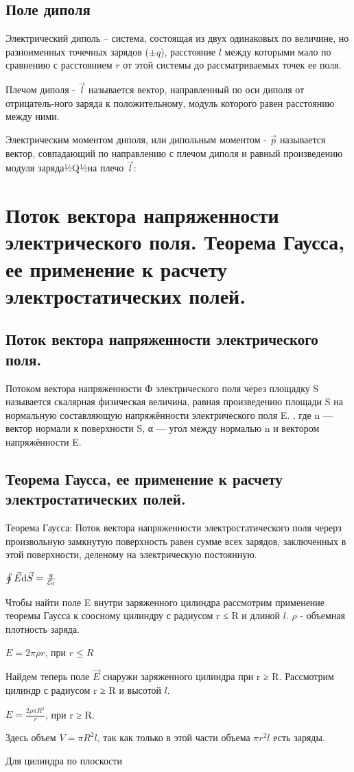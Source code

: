 \documentclass[12pt]{report}
\begin{document}
\subsection{Поле диполя}
Электрический диполь – система, состоящая из двух одинаковых по величине, но разноименных точечных зарядов ($\pm q$), расстояние $l$ между которыми мало по сравнению с расстоянием $r$ от этой системы до рассматриваемых точек ее поля.

Плечом диполя - $\vec{l}$ называется вектор, направленный по оси диполя от отрицатель-ного заряда к положительному, модуль которого равен расстоянию между ними.

Электрическим моментом диполя, или дипольным моментом - $\vec{p}$ называется вектор, совпадающий по направлению с плечом диполя и равный произведению модуля заряда½Q½на плечо $\vec{l}$:
\section{Поток вектора напряженности электрического поля.
  Теорема Гаусса, ее применение к расчету электростатических полей.}
\subsection{Поток вектора напряженности электрического поля.}
Потоком вектора напряженности Ф электрического поля через площадку S называется скалярная физическая величина,
равная произведению площади S на нормальную составляющую напряжённости электрического поля E. , где n — вектор нормали к поверхности S, α — угол между нормалью n и вектором напряжённости E.
\subsection{Теорема Гаусса, ее применение к расчету электростатических полей.}
Теорема Гаусса: Поток вектора напряженности электростатического поля черерз произвольную замкнутую поверхность равен сумме всех зарядов, заключенных в этой поверхности, деленому на электрическую постоянную.
\begin{center}
    $\oint \vec{E}\differential\vec{S} = \frac{q}{\varE_0}$
\end{center}
Чтобы найти поле E внутри заряженного цилиндра рассмотрим
применение теоремы Гаусса к соосному цилиндру с радиусом r ≤ R и длиной $l$.
$\rho$ - объемная плотность заряда.
\begin{center}
    $E = 2 \pi \rho r$, при $r ≤ R$
\end{center}
Найдем теперь поле $\vec{E}$ снаружи заряженного цилиндра при r ≥ R.
Рассмотрим цилиндр с радиусом r ≥ R и высотой $l$.
\begin{center}
    $E = \frac{2 \rho \pi R^2}{r}$, при r ≥ R.
\end{center}
\par Здесь объем $V = \pi R^2 l$, так как только в этой части объема $\pi r^2 l$ есть
заряды.
\par Для цилиндра по плоскости
\end{document}
